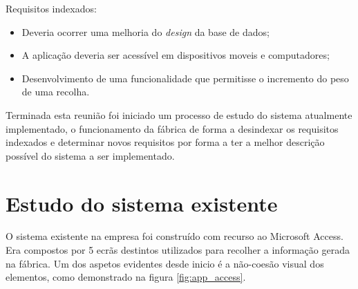 Requisitos indexados:
\begin{itemize}
	\item Deveria ocorrer uma melhoria do \textit{design} da base de dados;
	\item A aplicação deveria ser acessível em dispositivos moveis e computadores;
	\item Desenvolvimento de uma funcionalidade que permitisse o incremento do peso de uma recolha.
\end{itemize}
Terminada esta reunião foi iniciado um processo de estudo do sistema atualmente implementado, o funcionamento da fábrica de forma a desindexar os requisitos indexados e determinar novos requisitos por forma a ter a melhor descrição possível do sistema a ser implementado.

\section{Estudo do sistema existente}
O sistema existente na empresa foi construído com recurso ao Microsoft Access. Era compostos por 5 ecrãs destintos utilizados para recolher a informação gerada na fábrica. Um dos aspetos evidentes desde inicio é a não-coesão visual dos elementos, como demonstrado na figura \ref{fig:app_access}.

